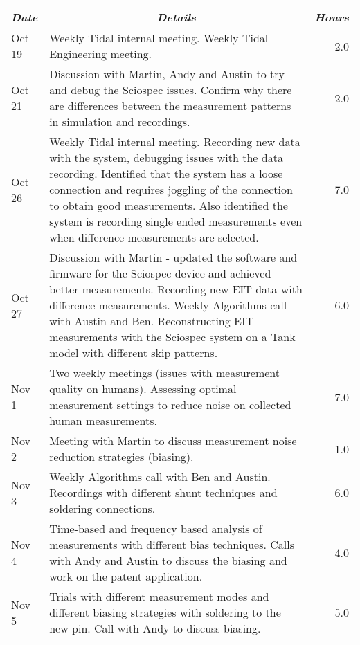 \documentclass[a4paper,12pt]{article}
\newcommand{\EXP}[1]{\FPadd\TOTAL{\TOTAL}{#1}%
   \global\let\TOTAL\TOTAL
   #1}
\begin{document}
\begin{center}
\begin{longtable}{lp{11cm}r}
{\em Date} & \multicolumn{1}{c}{\em Details} & {\em Hours} 
\\ \hline

Oct 19 & Weekly Tidal internal meeting. \newline Weekly Tidal Engineering meeting. & \EXP{2.0} \\
Oct 21 & Discussion with Martin, Andy and Austin to try and debug the Sciospec issues. Confirm why there are differences between the measurement patterns in simulation and recordings. & \EXP{2.0} \\
Oct 26 & Weekly Tidal internal meeting. \newline Recording new data with the system, debugging issues with the data recording. Identified that the system  has a loose connection and requires joggling of the connection to obtain good measurements. Also identified the system is recording single ended measurements even when difference measurements are selected.  & \EXP{7.0} \\
Oct 27 & Discussion with Martin - updated the software and firmware for the Sciospec device and achieved better measurements. \newline Recording new EIT data with difference measurements. \newline Weekly Algorithms call with Austin and Ben. \newline Reconstructing EIT measurements with the Sciospec system on a Tank model with different skip patterns. & \EXP{6.0} \\
Nov 1 & Two weekly meetings (issues with measurement quality on humans). \newline Assessing optimal measurement settings to reduce noise on collected human measurements. & \EXP{7.0} \\
Nov 2 & Meeting with Martin to discuss measurement noise reduction strategies (biasing). & \EXP{1.0} \\
Nov 3 & Weekly Algorithms call with Ben and Austin. \newline Recordings with different shunt techniques and soldering connections. & \EXP{6.0} \\
Nov 4 & Time-based and frequency based analysis of measurements with different bias techniques. \newline Calls with Andy and Austin to discuss the biasing and work on the patent application. & \EXP{4.0} \\
Nov 5 & Trials with different measurement modes and different biasing strategies with soldering to the new pin. \newline Call with Andy to discuss biasing. & \EXP{5.0} \\

\end{longtable}
\end{center}
\end{document}
